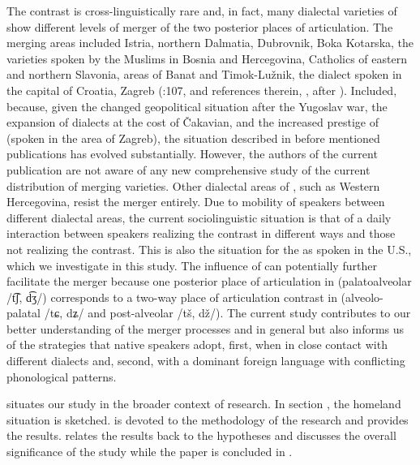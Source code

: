 \documentclass[output=paper,modfonts,newtxmath,hidelinks,]{langscibook}
\begin{document}
The contrast is cross-linguistically rare and, in fact, many dialectal varieties of  show different levels of merger of the two posterior places of articulation. The merging areas included Istria, northern Dalmatia, Dubrovnik, Boka Kotarska, the varieties spoken by the Muslims in Bosnia and Hercegovina, Catholics of eastern and northern Slavonia, areas of Banat and Timok-Lužnik, the dialect spoken in the capital of Croatia, Zagreb (\citealt{Stankiewicz1986}:107, and references therein, \citealt[296]{Ivic1958}, \citealt{Zygis2003} after \citealt{Ivic1958}). Included, because, given the changed geopolitical situation after the Yugoslav war, the expansion of  dialects at the cost of Čakavian, and the increased prestige of  (spoken in the area of Zagreb), the situation described in before mentioned publications has evolved substantially. However, the authors of the current publication are not aware of any new comprehensive study of the current distribution of merging varieties. Other dialectal areas of , such as Western Hercegovina, resist the merger entirely. Due to mobility of speakers between different dialectal areas, the current sociolinguistic situation is that of a daily interaction between speakers realizing the contrast in different ways and those not realizing the contrast. This is also the situation for the  as spoken in the U.S., which we investigate in this study. The influence of  can potentially further facilitate the merger because one posterior place of articulation in  (palatoalveolar /t͡ʃ, d͡ʒ/) corresponds to a two-way place of articulation contrast in  (alveolo-palatal /tɕ, dʑ/ and post-alveolar /tš, dž/). The current study contributes to our better understanding of the merger processes and  in general but also informs us of the strategies that native speakers adopt, first, when in close contact with different dialects and, second, with a dominant foreign language with conflicting phonological patterns.



 situates our study in the broader context of  research. 
In section , the homeland situation is sketched.  is devoted to the methodology of the research and  provides the results. 
 relates the results back to the hypotheses and discusses the overall significance of the study while the paper is concluded in .
\end{document}
